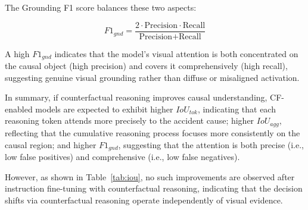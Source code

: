 \documentclass{article}
\begin{document}
The Grounding F1 score balances these two aspects:

\begin{equation}
F1_{gnd} = \frac{2 \cdot \text{Precision} \cdot \text{Recall}}
{\text{Precision} + \text{Recall}}
\end{equation}

A high $F1_{gnd}$ indicates that the model's visual attention 
is both concentrated on the causal object (high precision) 
and covers it comprehensively (high recall), suggesting 
genuine visual grounding rather than diffuse or misaligned 
activation.

In summary, if counterfactual reasoning improves causal understanding, CF-enabled models are expected to exhibit higher $IoU_{tok}$, indicating that each reasoning token attends more precisely to the accident cause; higher $IoU_{agg}$, reflecting that the cumulative reasoning process focuses more consistently on the causal region; and higher $F1_{gnd}$, suggesting that the attention is both precise (i.e., low false positives) and comprehensive (i.e., low false negatives).

However, as shown in Table~\ref{tab:iou}, no such improvements 
are observed after instruction fine-tuning with counterfactual reasoning, indicating that the decision shifts via counterfactual reasoning operate independently of visual evidence.


\end{document}
